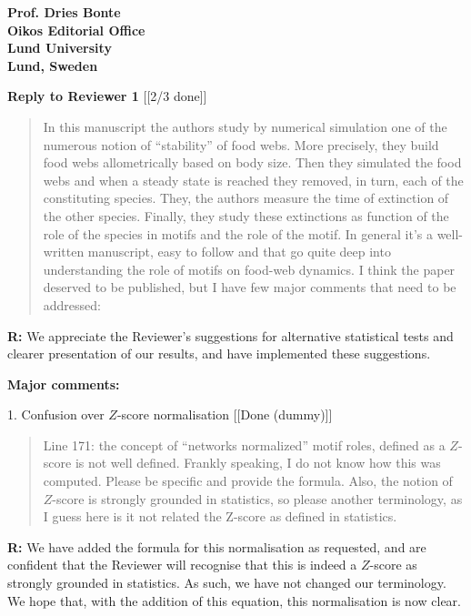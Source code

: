 \documentclass[12pt]{letter}
\begin{document}
\begin{letter}{\bf Prof. Dries Bonte\\
Oikos Editorial Office \\
Lund University \\
Lund, Sweden}
\clearpage

{\large\textbf{Reply to Reviewer 1}} [[2/3 done]]

  \begin{quotation}

    In this manuscript the authors study by numerical simulation one of the numerous notion of “stability” of food webs. More precisely, they build food webs allometrically based on body size. Then they simulated the food webs and when a steady state is reached they removed, in turn, each of the constituting species. They, the authors measure the time of extinction of the other species. Finally, they study these extinctions as function of the role of the species in motifs and the role of the motif. In general it’s a well-written manuscript, easy to follow and that go quite deep into understanding the role of motifs on food-web dynamics. I think the paper deserved to be published, but I have few major comments that need to be addressed:

  \end{quotation}

  \textbf{R:} We appreciate the Reviewer's suggestions for alternative statistical tests and clearer presentation of our results, and have implemented these suggestions.

  \smallskip

  \textbf{Major comments:}

    1. Confusion over $Z$-score normalisation [[Done (dummy)]]

      \begin{quotation}
        Line 171: the concept of “networks normalized” motif roles, defined as a $Z$-score is not well defined. Frankly speaking, I do not know how this was computed. Please be specific and provide the formula. Also, the notion of $Z$-score is strongly grounded in statistics, so please another terminology, as I guess here is it not related the Z-score as defined in statistics.
      \end{quotation}

      \smallskip

      \textbf{R:} We have added the formula for this normalisation as requested, and are confident that the Reviewer will recognise that this is indeed a $Z$-score as strongly grounded in statistics. As such, we have not changed our terminology. We hope that, with the addition of this equation, this normalisation is now clear.


\end{letter}
\end{document}
